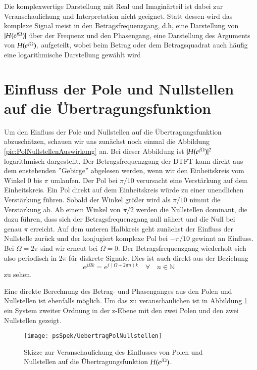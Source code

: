 Die komplexwertige Darstellung mit Real und Imaginärteil ist dabei
zur Veranschaulichung und Interpretation nicht geeignet. Statt
dessen wird das komplexe Signal meist in den Betragsfrequenzgang,
d.h, eine Darstellung von $|H (e^{j\Omega})|$ über der Frequenz und den
Phasengang, eine Darstellung des Arguments von $H (e^{j\Omega})$,
aufgeteilt, wobei beim Betrag oder dem Betragsquadrat auch häufig
eine logarithmische Darstellung gewählt wird

\section{Einfluss der Pole und Nullstellen auf die Übertragungsfunktion}
Um den Einfluss der Pole und Nullstellen auf die
Übertragungsfunktion abzuschätzen, schauen wir uns zunächst noch
einmal die Abbildung \ref{pic:PolNullstellenAuswirkung} an. Bei
dieser Abbildung ist $|H (e^{j\Omega})|^2$ logarithmisch dargestellt. Der
Betragsfrequenzgang der DTFT kann direkt aus dem enstehenden
''Gebirge'' abgelesen werden, wenn wir den Einheitskreis vom
Winkel $0$ bis $\pi$ umlaufen. Der Pol bei $\pi/10$ verursacht
eine Verstärkung auf dem Einheitskreis. Ein Pol direkt auf dem
Einheitskreis würde zu einer unendlichen Verstärkung führen.
Sobald der Winkel größer wird als $\pi/10$ nimmt die Verstärkung
ab. Ab einem Winkel von $\pi/2$ werden die Nullstellen dominant,
die dazu führen, dass sich der Betragsfrequenzgang null nähert und
die Null bei genau $\pi$ erreicht. Auf dem unteren Halbkreis geht
zunächst der Einfluss der Nullstelle zurück und der konjugiert
komplexe Pol bei $-\pi/10$ gewinnt an Einfluss. Bei $\Omega =
2\pi$ sind wir erneut bei $\Omega = 0$. Der Betragsfrequenzgang
wiederholt sich also periodisch in $2\pi$ für diskrete Signale.
Dies ist auch direkt aus der Beziehung
\begin{equation}\label{Eq:Spek:PeridozitaetsERklaerung}
    e^{j\Omega k} = e^{j(\Omega +2\pi n) k} \quad \forall \quad n \in \mathbb{N}
\end{equation}
zu sehen.

Eine direkte Berechnung des Betrag- und Phasenganges aus den Polen
und Nullstellen ist ebenfalls möglich. Um das zu veranschaulichen
ist in Abbildung \ref{pic:SpecPolNullstellen} ein System zweiter
Ordnung in der z-Ebene mit den zwei Polen und den zwei Nullstellen
gezeigt.
\begin{figure}[H]
\begin{center}
\texttt{[image: psSpek/UebertragPolNullstellen]}
\caption{\label{pic:SpecPolNullstellen}Skizze zur
Veranschaulichung des Einflusses von Polen und Nullstellen auf die
Übertragungsfunktion $H (e^{j\Omega})$.}
\end{center}
\end{figure}

